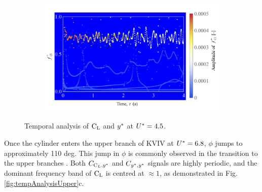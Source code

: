 \documentclass[oneside]{utmthesis}
\begin{document}
\begin{figure} \continuedfloat
  \centering
  \begin{subfigure}[h]{1\textwidth}
    \includegraphics[width=\textwidth]{figs/tempAnalysisKVIV-c}
    \caption{}
    \label{fig:tempAnalysisKVIV-c}
  \end{subfigure}

  \caption{Temporal analysis of $\text{C}_{\text{L}}$ and $y^{*}$ at $U^{*} = 4.5$.} \label{fig:tempAnalysisKVIV}
\end{figure}

Once the cylinder enters the upper branch of KVIV at $U^{*} = 6.8$, $\phi$ jumps to approximately 110 deg. This jump in $\phi$ is commonly observed in the transition to the upper branches \citep{Maruai2018}. Both $C_{\text{C}_{L},y^{*}}$ and $C_{y^{*},y^{*}}$ signals are highly periodic, and the dominant frequency band of $\text{C}_{\text{L}}$ is centred at $\approx 1$, as demonstrated in Fig. \ref{fig:tempAnalysisUpper}c.
\end{document}
